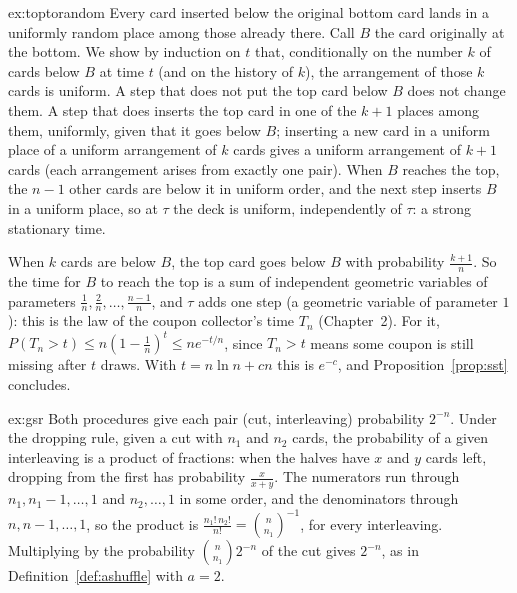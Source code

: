 \begin{solution}{ex:toptorandom}
\idea Every card inserted below the original bottom card lands in a uniformly random place among those already there.
\writeup Call $B$ the card originally at the bottom. We show by induction on $t$ that, conditionally on the number $k$ of cards below $B$ at
time $t$ (and on the history of $k$), the arrangement of those $k$ cards is uniform. A step that does not put the top card below $B$ does not
change them. A step that does inserts the top card in one of the $k+1$ places among them, uniformly, given that it goes below $B$;
inserting a new card in a uniform place of a uniform arrangement of $k$ cards gives a uniform arrangement of $k+1$ cards (each
arrangement arises from exactly one pair). When $B$ reaches the top, the $n-1$ other cards are below it in uniform order, and the
next step inserts $B$ in a uniform place, so at $\tau$ the deck is uniform, independently of $\tau$: a strong stationary time.

When $k$ cards are below $B$, the top card goes below $B$ with probability $\frac{k+1}n$. So the time for $B$ to reach the top is a sum of independent
geometric variables of parameters $\frac1n,\frac2n,\dots,\frac{n-1}n$, and $\tau$ adds one step (a geometric variable of parameter $1$): this is the law of the
coupon collector's time $T_n$ (Chapter~2). For it, $P(T_n>t)\le n(1-\frac1n)^t\le ne^{-t/n}$, since $T_n>t$ means some coupon is still missing after $t$
draws. With $t=n\ln n+cn$ this is $e^{-c}$, and Proposition~\ref{prop:sst} concludes.
\end{solution}

\begin{solution}{ex:gsr}
\idea Both procedures give each pair (cut, interleaving) probability $2^{-n}$.
\writeup Under the dropping rule, given a cut with $n_1$ and $n_2$ cards, the probability of a given interleaving is a product of fractions: when
the halves have $x$ and $y$ cards left, dropping from the first has probability $\frac x{x+y}$. The numerators run through $n_1,n_1-1,\dots,1$ and $n_2,\dots,1$ in
some order, and the denominators through $n,n-1,\dots,1$, so the product is $\frac{n_1!\,n_2!}{n!}=\binom n{n_1}^{-1}$, for every interleaving. Multiplying by the
probability $\binom n{n_1}2^{-n}$ of the cut gives $2^{-n}$, as in Definition~\ref{def:ashuffle} with $a=2$.
\end{solution}

